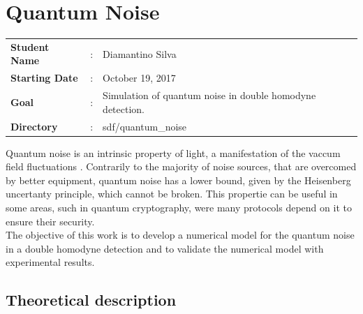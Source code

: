 \clearpage
\section{Quantum Noise}


\begin{tcolorbox}	
\begin{tabular}{p{2.75cm} p{0.2cm} p{10.5cm}}
\textbf{Student Name}  &:& Diamantino Silva\\
\textbf{Starting Date} &:& October 19, 2017\\
\textbf{Goal}          &:& Simulation of quantum noise in double homodyne detection.\\
\textbf{Directory}     &:& sdf/quantum\_noise
\end{tabular}
\end{tcolorbox}
%
\vspace{2em}
%
Quantum noise is an intrinsic property of light, a manifestation of the vaccum field fluctuations
\cite{fox2006}.
Contrarily to the majority of noise sources, that are overcomed by better equipment, quantum noise has a lower bound, given by the Heisenberg uncertanty principle, which cannot be broken. This propertie can be useful in some areas, such in quantum cryptography, were many protocols depend on it to ensure their security.\\
The objective of this work is to develop a numerical model for the quantum noise in a double homodyne detection and to validate the numerical model with experimental results.\\


\subsection{Theoretical description}\label{sec:intro}

